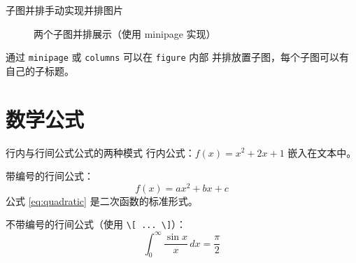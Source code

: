 \documentclass[UTF8,11pt,aspectratio=169]{beamer}
\begin{document}
\begin{frame}{子图并排}{手动实现并排图片}
    \begin{figure}
        \centering
        \begin{minipage}{0.45\textwidth}
            \centering
            \caption*{(a) 左侧子图}
        \end{minipage}
        \hfill
        \begin{minipage}{0.45\textwidth}
            \centering
            \caption*{(b) 右侧子图}
        \end{minipage}
        \caption{两个子图并排展示（使用 minipage 实现）}
        \label{fig:sidebyside}
    \end{figure}
    通过 \texttt{minipage} 或 \texttt{columns} 可以在 \texttt{figure} 内部
    并排放置子图，每个子图可以有自己的子标题。
\end{frame}

\section{数学公式}

\begin{frame}[fragile]{行内与行间公式}{公式的两种模式}
    行内公式：$f(x) = x^2 + 2x + 1$ 嵌入在文本中。

    带编号的行间公式：
    \begin{equation}
        \label{eq:quadratic}
        f(x) = ax^2 + bx + c
    \end{equation}
    公式 \eqref{eq:quadratic} 是二次函数的标准形式。

    不带编号的行间公式（使用 \verb|\[ ... \]|）：
    \[
        \int_{0}^{\infty} \frac{\sin x}{x}\,dx = \frac{\pi}{2}
    \]
\end{frame}
\end{document}
